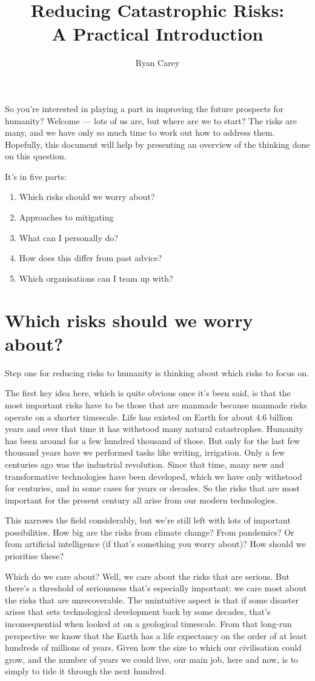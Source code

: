 ﻿\documentclass[12pt]{article}
\title{Reducing Catastrophic Risks:\\ A Practical Introduction}
\author{Ryan Carey}
\begin{document}
\maketitle
So you're interested in playing a part in improving the future prospects for humanity? Welcome --- lots of us are, but 
where are we to start? The risks are many, and we have only so much time to work out how to address them. Hopefully, 
this document 
will help by presenting an overview of the thinking done on this question.

It's in five parts: 
\begin{enumerate}
    \item Which risks should we worry about?
    \item Approaches to mitigating 
    \item What can I personally do? 
    \item How does this differ from past advice? 
    \item Which organisations can I team up with?
\end{enumerate}

\section{Which risks should we worry about?}
Step one for reducing risks to humanity is thinking about which risks to focus on. 

The first key idea here, which is quite obvious once it's been said, is that the most important risks have to be those that are 
manmade because manmade risks operate on a shorter timescale. Life has existed on Earth for about 4.6 billion years and 
over that time it has withstood many natural catastrophes.
Humanity has been around for a few hundred thousand of those. But only for the last few thousand years have we performed 
tasks like writing, irrigation. Only a few centuries ago was the industrial revolution. 
Since that time, many new and transformative technologies have been developed, which we have only withstood for centuries, and 
in some cases for years or decades. So the risks that are most important for the present century all arise from our 
modern technologies.

This narrows the field considerably, but we're still left with lots of important possibilities. How big are the risks from climate change? From pandemics? Or from artificial intelligence (if that's something you worry about)? How should we prioritise these?

Which do we care about? Well, we care about the risks that are serious. But there's a threshold of 
seriousness that's especially important: we care most about the risks that are unrecoverable. 
The unintuitive aspect is that if some disaster arises that sets technological development back by some decades, 
that's inconsequential when looked at on a geological timescale. From that long-run perspective
we know that the Earth has a life expectancy on the order of at least hundreds of millions 
of years. Given how the size to which our civilisation could grow, and the number of years we 
could live, our main job, here and now, is to simply to tide it through the next hundred.
\end{document}
